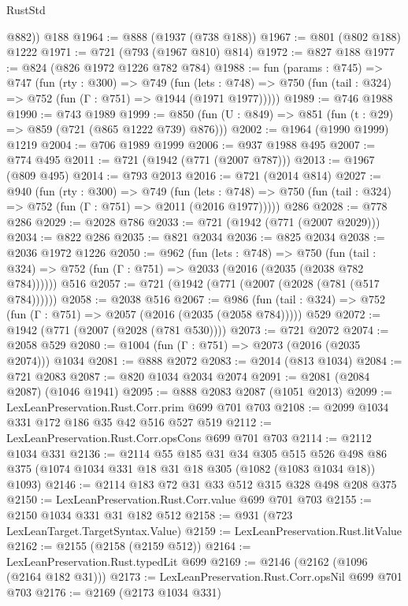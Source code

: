 \begin{lexlean}{RustStd}
\begin{coremodule}
        @882))
    @188
@1964 := @888 (@1937 (@738 @188))
@1967 := @801 (@802 @188) @1222
@1971 := @721 (@793 (@1967 @810) @814)
@1972 := @827 @188
@1977 := @824 (@826 @1972 @1226 @782 @784)
@1988 := fun (params : @745) =>
  @747
    (fun (rty : @300) =>
    @749
      (fun (lets : @748) =>
      @750 (fun (tail : @324) => @752 (fun (Γ : @751) => @1944 (@1971 @1977)))))
@1989 := @746 @1988
@1990 := @743 @1989
@1999 := @850 (fun (U : @849) => @851 (fun (t : @29) => @859 (@721 (@865 @1222 @739) @876)))
@2002 := @1964 (@1990 @1999) @1219
@2004 := @706 @1989 @1999
@2006 := @937 @1988 @495
@2007 := @774 @495
@2011 := @721 (@1942 (@771 (@2007 @787)))
@2013 := @1967 (@809 @495)
@2014 := @793 @2013
@2016 := @721 (@2014 @814)
@2027 := @940
    (fun (rty : @300) =>
    @749
      (fun (lets : @748) =>
      @750 (fun (tail : @324) => @752 (fun (Γ : @751) => @2011 (@2016 @1977)))))
    @286
@2028 := @778 @286
@2029 := @2028 @786
@2033 := @721 (@1942 (@771 (@2007 @2029)))
@2034 := @822 @286
@2035 := @821 @2034
@2036 := @825 @2034
@2038 := @2036 @1972 @1226
@2050 := @962
    (fun (lets : @748) =>
    @750 (fun (tail : @324) => @752 (fun (Γ : @751) => @2033 (@2016 (@2035 (@2038 @782 @784))))))
    @516
@2057 := @721 (@1942 (@771 (@2007 (@2028 (@781 (@517 @784))))))
@2058 := @2038 @516
@2067 := @986
    (fun (tail : @324) => @752 (fun (Γ : @751) => @2057 (@2016 (@2035 (@2058 @784)))))
    @529
@2072 := @1942 (@771 (@2007 (@2028 (@781 @530))))
@2073 := @721 @2072
@2074 := @2058 @529
@2080 := @1004 (fun (Γ : @751) => @2073 (@2016 (@2035 @2074))) @1034
@2081 := @888 @2072
@2083 := @2014 (@813 @1034)
@2084 := @721 @2083
@2087 := @820 @1034 @2034 @2074
@2091 := @2081 (@2084 @2087) (@1046 @1941)
@2095 := @888 @2083 @2087 (@1051 @2013)
@2099 := LexLeanPreservation.Rust.Corr.prim @699 @701 @703
@2108 := @2099 @1034 @331 @172 @186 @35 @42 @516 @527 @519
@2112 := LexLeanPreservation.Rust.Corr.opsCons @699 @701 @703
@2114 := @2112 @1034 @331
@2136 := @2114
    @55
    @185
    @31
    @34
    @305
    @515
    @526
    @498
    @86
    @375
    (@1074 @1034 @331 @18 @31 @18 @305 (@1082 (@1083 @1034 @18)) @1093)
@2146 := @2114 @183 @72 @31 @33 @512 @315 @328 @498 @208 @375
@2150 := LexLeanPreservation.Rust.Corr.value @699 @701 @703
@2155 := @2150 @1034 @331 @31 @182 @512
@2158 := @931 (@723 LexLeanTarget.TargetSyntax.Value)
@2159 := LexLeanPreservation.Rust.litValue
@2162 := @2155 (@2158 (@2159 @512))
@2164 := LexLeanPreservation.Rust.typedLit @699
@2169 := @2146 (@2162 (@1096 (@2164 @182 @31)))
@2173 := LexLeanPreservation.Rust.Corr.opsNil @699 @701 @703
@2176 := @2169 (@2173 @1034 @331)

\end{coremodule}
\end{lexlean}
